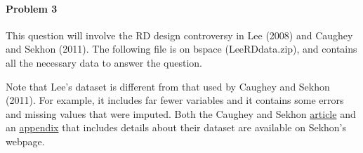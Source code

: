 \documentclass{article}
\begin{document}
\paragraph{Problem 3} 

This question will involve the RD design controversy in  Lee (2008)
and Caughey and Sekhon (2011).  The
following file is on bspace (LeeRDdata.zip), and contains all the necessary data to
answer the question. 


\vspace{1em}
\noindent Note that Lee's dataset is different from that used by
 Caughey and Sekhon (2011). For example, it includes far fewer
variables and it contains some errors and missing values that were
imputed. Both the Caughey and Sekhon
\href{http://sekhon.berkeley.edu/papers/CaugheySekhonRD.pdf}{article}
and an
\href{http://sekhon.berkeley.edu/papers/RDappendix.pdf}{appendix} that
includes details about their dataset are available on Sekhon's
webpage.
\end{document}
